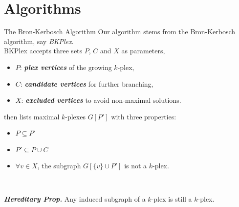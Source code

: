 \documentclass[9pt]{beamer} %
\begin{document}
\section{Algorithms}
\begin{frame}{The Bron-Kerbosch Algorithm}
    Our algorithm stems from the Bron-Kerbosch algorithm, say \emph{BKPlex}.\\
    BKPlex accepts three sets $P$, $C$ and $X$ as parameters,
    \begin{itemize}
        \item $P$: \textbf{\emph{plex vertices}} of the growing $k$-plex,
        \item $C$: \textbf{\emph{candidate vertices}} for further branching,
        \item $X$: \textbf{\emph{excluded vertices}} to avoid non-maximal solutions.
    \end{itemize}
    then lists maximal $k$-plexes $G[P']$ with three properties: \\
    \begin{minipage}{0.14\linewidth}
        \begin{itemize}
            \item $P \subseteq P'$
        \end{itemize}
    \end{minipage}
    \begin{minipage}{0.18\linewidth}
        \begin{itemize}
            \item $P' \subseteq P\cup C$
        \end{itemize}
    \end{minipage}
    \begin{minipage}{0.65\linewidth}
        \begin{itemize}
            \item $\forall v\in X$, the subgraph $G[\{v\} \cup P']$ is not a $k$-plex.
        \end{itemize}
    \end{minipage}\\
    \vspace{0.25cm}
    \begin{flushright}
        \footnotesize \textbf{\emph{Hereditary Prop.}} Any induced subgraph of a $k$-plex is still a $k$-plex.
    \end{flushright}
\end{frame}
\end{document}

